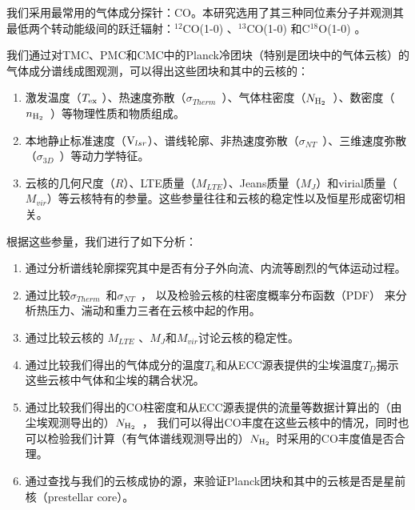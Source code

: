 \documentclass[UTF8]{pkuthss}
\newcommand{\coaa}{$^{12}$CO(1-0) }
\newcommand{\cobb}{$^{13}$CO(1-0) }
\newcommand{\cocc}{C$^{18}$O(1-0) }
\newcommand{\vlsr}{${\rm V } _{lsr}$}
\newcommand{\texc}{$T_{\rm {ex}}$ }
\newcommand{\nhyd}{$N_{\rm H_2}$\ }
\newcommand{\nnhyd}{$n_{\rm H_2}$\ }
\newcommand{\sigmath}{$\sigma _{Therm}$\ }
\newcommand{\sigmant}{$\sigma _{NT}$\ }
\newcommand{\sigmatd}{$\sigma _{3D}$\ }
\begin{document}
		我们采用最常用的气体成分探针：CO。本研究选用了其三种同位素分子并观测其最低两个转动能级间的跃迁辐射：\coaa 、\cobb  和\cocc 。

		我们通过对TMC、PMC和CMC中的Planck冷团块（特别是团块中的气体云核）的气体成分谱线成图观测，可以得出这些团块和其中的云核的：

		\begin{adjustwidth}{0.5cm}{0cm}
		\begin{enumerate}
			\item 激发温度（\texc ）、热速度弥散（\sigmath ）、气体柱密度（\nhyd ）、数密度（\nnhyd ）等物理性质和物质组成。

			\item 本地静止标准速度（\vlsr ）、谱线轮廓、非热速度弥散（\sigmant ）、三维速度弥散（\sigmatd ）等动力学特征。

			\item 云核的几何尺度（$R$）、LTE质量（$M_{LTE}$）、Jeans质量（$M_{J}$）和virial质量（$M_{vir}$）等云核特有的参量。这些参量往往和云核的稳定性以及恒星形成密切相关。
		\end{enumerate}
		\end{adjustwidth}
		
		根据这些参量，我们进行了如下分析：

		\begin{adjustwidth}{0.5cm}{0cm}
		\begin{enumerate}
			\item 通过分析谱线轮廓探究其中是否有分子外向流、内流等剧烈的气体运动过程。

			\item 通过比较\sigmath 和\sigmant ， 以及检验云核的柱密度概率分布函数（PDF） 来分析热压力、湍动和重力三者在云核中起的作用。

			\item 通过比较云核的 $M_{LTE}$ 、$M_{J}$和$M_{vir}$讨论云核的稳定性。

			\item 通过比较我们得出的气体成分的温度$T_k$和从ECC源表提供的尘埃温度$T_D$揭示这些云核中气体和尘埃的耦合状况。

			\item 通过比较我们得出的CO柱密度和从ECC源表提供的流量等数据计算出的（由尘埃观测导出的）\nhyd， 我们可以得出CO丰度在这些云核中的情况，同时也可以检验我们计算（有气体谱线观测导出的）\nhyd 时采用的CO丰度值是否合理。

			\item 通过查找与我们的云核成协的源，来验证Planck团块和其中的云核是否是星前核（prestellar core）。
		\end{enumerate}
		\end{adjustwidth}
\end{document}
